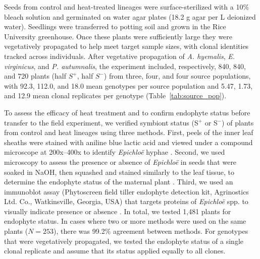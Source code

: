 \documentclass[12pt]{article}\usepackage[]{graphicx}\usepackage[dvipsnames]{xcolor}
\begin{document}
Seeds from control and heat-treated lineages were surface-sterilized with a 10\% bleach solution and germinated on water agar plates (18.2 g agar per L deionized water).
Seedlings were transferred to potting soil and grown in the Rice University greenhouse. 
Once these plants were sufficiently large they were vegetatively propagated to help meet target sample sizes, with clonal identities tracked across individuals. 
After vegetative propagation of \textit{A. hyemalis}, \textit{E. virginicus}, and \textit{P. autumnalis}, the experiment included, respectively, 840, 840, and 720 plants (half $S^+$, half $S^-$) from three, four, and four source populations, with 92.3, 112.0, and 18.0 mean genotypes per source population and 5.47, 1.73, and 12.9 mean clonal replicates per genotype (Table~\ref{tab:source_pop}). 

To assess the efficacy of heat treatment and to confirm endophyte status before transfer to the field experiment, we verified symbiont status (S$^+$ or S$^-$) of plants from control and heat lineages using three methods. 
First, peels of the inner leaf sheaths were stained with aniline blue lactic acid and viewed under a compound microscope at 200x–400x to identify \emph{Epichloë} hyphae \citep{jackson1988rapid}. 
Second, we used microscopy to assess the presence or absence of \emph{Epichloë} in seeds that were soaked in NaOH, then squashed and stained similarly to the leaf tissue, to determine the endophyte status of the maternal plant \citep{fowler2025increasing}. 
Third, we used an immunoblot assay (Phytoscreen field tiller endophyte detection kit, Agrinostics Ltd. Co., Watkinsville, Georgia, USA) that targets proteins of \emph{Epichloë} spp. to visually indicate presence or absence \citep{koh2006rapid}. 
In total, we tested 1,481 plants for endophyte status. 
In cases where two or more methods were used on the same plants ($N=253$), there was 99.2\% agreement between methods.
For genotypes that were vegetatively propagated, we tested the endophyte status of a single clonal replicate and assume that its status applied equally to all clones. 
\end{document}
